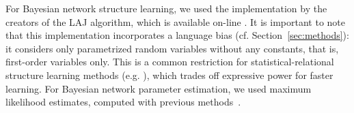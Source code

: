 \documentclass[runningheads,a4paper]{llncs}
\begin{document}
For Bayesian network structure learning, we used the implementation by the creators of the LAJ algorithm, which is available on-line \cite{bib:jbnsite}. It is important to note that this implementation incorporates a language bias (cf. Section~\ref{sec:methods}): it considers only parametrized random variables without any constants, that is, first-order variables only. This is a common restriction for statistical-relational structure learning methods (e.g. \cite{Friedman99prm,Domingos2009,Ravkic2015}),  which trades off expressive power for faster learning. For Bayesian network parameter estimation, we used maximum likelihood estimates, computed with previous methods~\cite{Qian2014a}.




\end{document}

